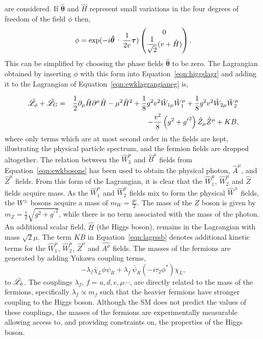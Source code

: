 are considered. If $\boldsymbol{\hat{\theta}}$ and $\hat{H}$ represent small variations in 
the four degrees of freedom of the field $\phi$ then, 
\begin{equation}
\phi = \exp(-i\boldsymbol{\hat{\theta}}\cdot\frac{1}{2v}\boldsymbol{\tau}) 
\everymath{\displaystyle} \begin{pmatrix}
0 \\ 
\frac{1}{\sqrt{2}}(v+\hat{H})
\end{pmatrix}.
\end{equation}
This can be simplified by choosing the phase fields $\boldsymbol{\hat{\theta}}$ 
to be zero. The Lagrangian obtained by inserting $\phi$ with this form 
into Equation~\ref{eqn:higgslagr} and adding it to the Lagrangian of 
Equation~\ref{eqn:ewklagrangianeg} is,

\begin{eqnarray}
\hat{\mathscr{L}}_{\phi}+\hat{\mathscr{L}}_{G} 
	     & = &   \frac{1}{2} \partial_{\mu} \hat{H} \partial^{\mu} \hat{H} 
	     - \mu^{2} \hat{H}^{2} 
	     + \frac{1}{8} g^{2}v^{2}\hat{W}_{1\mu}\hat{W}_{1}^{\mu}
	     + \frac{1}{8} g^{2}v^{2}\hat{W}_{2\mu}\hat{W}_{2}^{\mu}	
\nonumber \\
	    & & - \frac{v^{2}}{8} \left(g^{2}+{g^{\prime}}^{2}\right)\hat{Z}_{\mu}\hat{Z}^{\mu}
	     + KB ,
\label{eqn:lagrssb}
\end{eqnarray}
where only terms which are at most second order in the fields are kept, illustrating the physical 
particle spectrum, and the 
fermion fields are dropped altogether. 
The relation between the $\hat{W}^{\mu}_{3}$ 
and $\hat{B}^{\mu}$ fields from Equation~\ref{eqn:ewkbosons} has been used to obtain
the physical photon, $\hat{A}^{\mu}$, and $\hat{Z}^{\mu}$ 
fields. 
From this form of the Lagrangian, it is clear that the $\hat{W}_{1}^{\mu}$,  
$\hat{W}^{\mu}_{2}$ and $\hat{Z}$ fields acquire mass. As the $\hat{W}_{1}^{\mu}$ and 
$\hat{W}^{\mu}_{2}$ fields mix to form the physical $\hat{W}^{\pm}$ fields, 
the $W^{\pm}$ bosons acquire a mass of $m_{W} = \frac{\displaystyle gv}{\displaystyle 2}$.
The mass of the $Z$ boson is given by 
$m_{Z}=\frac{\displaystyle v}{\displaystyle 2}\sqrt{g^{2}+{g^{\prime}}^{2}}$, 
while there is no term associated with the mass of the photon.
An additional scalar field, $\hat{H}$ (the Higgs boson), 
remains in the Lagrangian with mass $\sqrt{2}\mu$. 
The term $KB$ in Equation~\ref{eqn:lagrssb} denotes additional kinetic terms for the $\hat{W}^{\mu}_{1}$, 
$\hat{W}^{\mu}_{2}$, $\hat{Z}^{\mu}$ and $\hat{A^{\mu}}$ fields. 
The masses of the fermions are generated by adding Yukawa coupling
terms,
\begin{equation} 
-\lambda_{f} \bar{\chi}_{L} \phi \psi_{R} + \lambda_{f^{\prime}}\bar{\psi}_{R}(-i\tau_{2}\phi^{*})\chi_{L},
\end{equation}
to $\hat{\mathscr{L}}_{\phi}$. 
The couplings $\lambda_{f}$, $f=u,d,e,\mu\cdots$,  are directly related
to the mass of the fermions, specifically 
$\lambda_{f}\propto m_{f}$ such that the heavier fermions have stronger
coupling to the Higgs boson. Although the SM does not predict the values of these
couplings, the masses of the fermions are experimentally measurable allowing 
access to, and providing constraints on, the properties of the Higgs boson.

